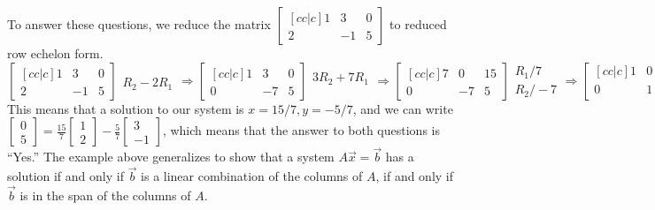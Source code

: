 \documentclass[10pt]{article}
\begin{document}
To answer these questions, we reduce the matrix $\begin{bmatrix}[cc|c]1&3& 0\\2&-1&5\end{bmatrix}$ to reduced row echelon form.
$$ \begin{bmatrix}[cc|c]1&3& 0\\2&-1&5\end{bmatrix}\begin{array}{l}\\ R_2-2R_1\end{array}
 \Rightarrow 
   \begin{bmatrix}[cc|c]1&3& 0\\0&-7&5\end{bmatrix} \begin{array}{l} 3R_2+7R_1\\ \ \end{array}
 \Rightarrow 
   \begin{bmatrix}[cc|c]7&0& 15\\0&-7&5\end{bmatrix} \begin{array}{l}R_1/7\\ R_2/-7\end{array}
 \Rightarrow 
   \begin{bmatrix}[cc|c]1&0& 15/7\\0&1&-5/7\end{bmatrix}.
$$
This means that a solution to our system is $x=15/7, y=-5/7$, and we can write $\begin{bmatrix} 0\\5\end{bmatrix} = \frac{15}{7}\begin{bmatrix} 1\\2\end{bmatrix}-\frac{5}{7}\begin{bmatrix} 3\\-1\end{bmatrix}$, which means that the answer to both questions is ``Yes.''  The example above generalizes to show that a system $A \vec x = \vec b$ has a solution if and only if $\vec b$ is a linear combination of the columns of $A$, if and only if $\vec b$ is in the span of the columns of $A$.
  
\end{document}
